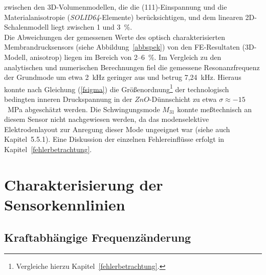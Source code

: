 zwischen den 3D-Volumenmodellen, die die (111)-Einspannung und die
Materialanisotropie ({\em SOLID64}-Elemente) berücksichtigen, und dem
linearen 2D-Schalenmodell liegt zwischen 1 und 3~\%.\\
%
Die Abweichungen der gemessenen Werte des optisch charakterisierten
Membrandrucksensors (siehe Abbildung~\ref{abbspek})
von den FE-Resultaten (3D-Modell, anisotrop) liegen im Bereich von 2--6~\%.
Im Vergleich zu den analytischen und numerischen Berechnungen fiel die
gemessene Resonanzfrequenz der Grundmode um etwa 2~kHz geringer aus und
betrug 7,24~kHz. Hieraus konnte nach Gleichung (\ref{fsigma}) die
Größenordnung\footnote{Vergleiche hierzu Kapitel~\ref{fehlerbetrachtung}.}
der technologisch bedingten inneren Druckspannung in der $ZnO$-Dünnschicht
zu etwa $\sigma \approx - 15$~MPa abgeschätzt werden. Die Schwingungsmode
$M_{31}$ konnte meßtechnisch an diesem Sensor nicht nachgewiesen werden,
da das modenselektive Elektrodenlayout zur Anregung dieser Mode ungeeignet
war (siehe auch Kapitel~5.5.1). Eine Diskussion der einzelnen
Fehlereinflüsse erfolgt in Kapitel~\ref{fehlerbetrachtung}.


\newpage

\section{Charakterisierung der Sensorkennlinien}
\label{sensorkennlinien}

\subsection{Kraftabhängige Frequenzänderung}
\label{kraftabh}

